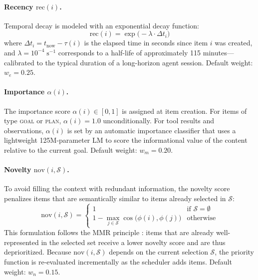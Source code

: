 \documentclass[review,12pt]{elsarticle}
\newcommand{\rec}{\mathrm{rec}}
\newcommand{\nov}{\mathrm{nov}}
\begin{document}
\paragraph{Recency $\rec(i)$.}
Temporal decay is modeled with an exponential decay function:
\begin{equation}
  \rec(i) = \exp\!\bigl(-\lambda \cdot \Delta t_i\bigr)
  \label{eq:recency}
\end{equation}
where $\Delta t_i = t_{\text{now}} - \tau(i)$ is the elapsed time in seconds
since item $i$ was created, and $\lambda = 10^{-4}\;\text{s}^{-1}$ corresponds
to a half-life of approximately 115 minutes—calibrated to the typical duration
of a long-horizon agent session.  Default weight: $w_e = 0.25$.

\paragraph{Importance $\alpha(i)$.}
The importance score $\alpha(i) \in [0,1]$ is assigned at item creation.
For items of type \textsc{goal} or \textsc{plan}, $\alpha(i) = 1.0$
unconditionally.  For tool results and observations, $\alpha(i)$ is set by
an automatic importance classifier that uses a lightweight 125M-parameter LM
to score the informational value of the content relative to the current goal.
Default weight: $w_m = 0.20$.

\paragraph{Novelty $\nov(i, \mathcal{S})$.}
To avoid filling the context with redundant information, the novelty score
penalizes items that are semantically similar to items already selected in
$\mathcal{S}$:
\begin{equation}
  \nov(i, \mathcal{S}) =
  \begin{cases}
    1 & \text{if } \mathcal{S} = \emptyset \\
    1 - \displaystyle\max_{j \in \mathcal{S}}
      \cos\!\bigl(\phi(i), \phi(j)\bigr) & \text{otherwise}
  \end{cases}
  \label{eq:novelty}
\end{equation}
This formulation follows the MMR principle \citep{carbonell1998mmr}: items that
are already well-represented in the selected set receive a lower novelty score
and are thus deprioritized.  Because $\nov(i, \mathcal{S})$ depends on the
current selection $\mathcal{S}$, the priority function is re-evaluated
incrementally as the scheduler adds items.  Default weight: $w_n = 0.15$.
\end{document}
